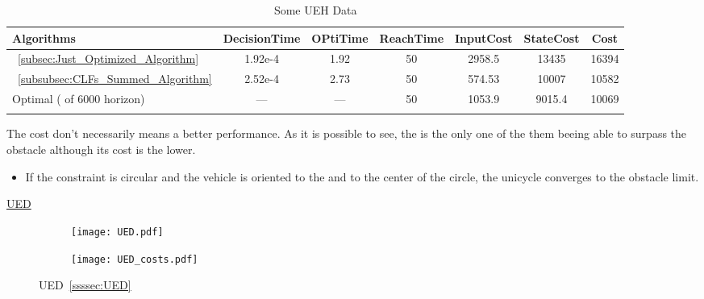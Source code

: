   \bgroup
 \begin{xltabular}{\textwidth}{|l|cccccc|}
   \toprule
   Algorithms   & DecisionTime & OPtiTime & ReachTime  & InputCost   & StateCost & Cost           \\
   \midrule
    ~\ref{subsec:Just_Optimized_Algorithm}           & 1.92e-4 & 1.92 & 50 & 2958.5 & 13435  & 16394 \\
    ~\ref{subsubsec:CLFs_Summed_Algorithm}        & 2.52e-4 & 2.73 & 50 & 574.53 & 10007 & 10582  \\
    Optimal ( of 6000 horizon)                        & ---     & ---  & 50  & 1053.9  & 9015.4 & 10069 \\
    \midrule
    \caption{Some UEH Data}
    \label{tab:Some_UEH_Data}\\
   \end{xltabular}
 \egroup


 The cost don't necessarily means a better performance. As it is possible to see, the  is the only one of the them beeing able to surpass the obstacle although its cost is the lower.

\begin{tcolorbox}[colback=blue!5!white,colframe=blue!35!white,title=Notes:]
\begin{itemize}
    \item If the constraint is circular and the vehicle is oriented to the \txtref and to the center of the circle, the unicycle converges to the obstacle limit.
  \end{itemize}
\end{tcolorbox} 

\newpage %

\underline{UED}
\label{UED_experiments} %

 \begin{figure}[htbp]
  \begin{subfigure}{0.5\textwidth}
    \centering
    \texttt{[image: UED.pdf]}
  \label{fig:UED_CostEvol}
  \end{subfigure}
  \begin{subfigure}{0.6\textwidth}
    \centering
    \texttt{[image: UED\_costs.pdf]}
  \label{fig:UED_trajectory}
  \end{subfigure}
  \caption{UED~\ref{ssssec:UED}}
\label{fig:UEDTrajectory_and_CostEvol}
\end{figure}



